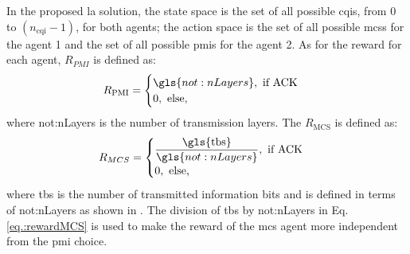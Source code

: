 In the proposed \gls{la} solution, the state space is the set of all possible \gls{cqi}s, from $0$ to $(n_{\text{cqi}}-1)$, for both agents; the action space is the set of all possible \gls{mcs}s for the agent 1 and the set of all possible \gls{pmi}s for the agent 2. As for the reward for each agent, $R_{PMI}$ is defined as:
%
\begin{equation}\label{eq.:rewardPMI}
R_{\text{PMI}} = \begin{cases}
\gls{not:nLayers}, \text{ if ACK} \\
0, \text{ else,}
\end{cases}
\end{equation}
%
\noindent where \gls{not:nLayers} is the number of transmission layers. The $R_{\text{MCS}}$ is defined as:
\begin{equation}\label{eq.:rewardMCS}
R_{MCS} = \begin{cases}
\dfrac{\textrm{\gls{tbs}}}{\gls{not:nLayers}}, \text{ if ACK} \\
0, \text{ else,}
\end{cases}
\end{equation}
\noindent where \gls{tbs} is the number of transmitted information bits and is defined in terms of \gls{not:nLayers} as shown in \cite{3gpp.38.214}.
%
The division of \gls{tbs} by \gls{not:nLayers} in Eq. \eqref{eq.:rewardMCS} is used to make the reward of the \gls{mcs} agent more independent from the \gls{pmi} choice.
%





